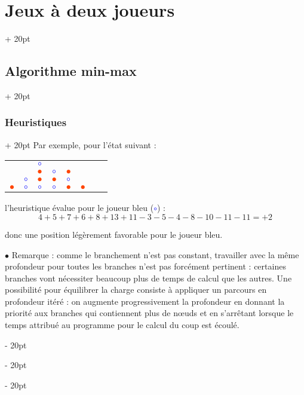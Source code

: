 \documentclass[a4paper, 12pt, twoside]{article}
\newcommand{\ind}[1][20pt]{\advance\leftskip + #1}
\newcommand{\deind}[1][20pt]{\advance\leftskip - #1}
\newenvironment{indt}[2][20pt]{#2 \par \ind[#1]}{\par \deind} %
\begin{document}
\begin{indt}{\section{Jeux à deux joueurs}}
\begin{indt}{\subsection{Algorithme min-max}}
\begin{indt}{\subsubsection{Heuristiques}}
                Par exemple, pour l'état suivant :
                \begin{center}
                    \begin{tabular}{|c|c|c|c|c|c|c|}
                        &
                        & \textcolor{blue}{$\circ$}
                        &&&&
                        \\
                        &
                        & \textcolor{ff4500}{$\bullet$}
                        & \textcolor{blue}{$\circ$}
                        & \textcolor{ff4500}{$\bullet$}
                        &&
                        \\
                        & \textcolor{blue}{$\circ$}
                        & \textcolor{ff4500}{$\bullet$}
                        & \textcolor{ff4500}{$\bullet$}
                        & \textcolor{blue}{$\circ$}
                        &&
                        \\
                        \textcolor{ff4500}{$\bullet$}
                        & \textcolor{blue}{$\circ$}
                        & \textcolor{blue}{$\circ$}
                        & \textcolor{blue}{$\circ$}
                        & \textcolor{ff4500}{$\bullet$}
                        & \textcolor{ff4500}{$\bullet$}
                        & $\phantom{\bullet}$
                        \\
                        \hline
                    \end{tabular}
                \end{center}

                l'heuristique évalue pour le joueur bleu (\textcolor{blue}{$\circ$}) :
                \[
                    4 + 5 + 7 + 6 + 8 + 13 + 11
                    - 3 - 5 - 4 - 8 - 10 - 11 - 11
                    = +2
                \]

                donc une position légèrement favorable pour le joueur bleu.

                \vspace{12pt}
                
                $\bullet$ Remarque : comme le branchement n'est pas constant, travailler avec la même profondeur pour toutes les branches n'est pas forcément pertinent : certaines branches vont nécessiter beaucoup plus de temps de calcul que les autres.
                Une possibilité pour équilibrer la charge consiste à appliquer un parcours en profondeur itéré : on augmente progressivement la profondeur en donnant la priorité aux branches qui contiennent plus de n\oe uds et en s'arrêtant lorsque le temps attribué au programme pour le calcul du coup est écoulé.
            \end{indt}
        \end{indt}
    \end{indt}
    
\end{document}

